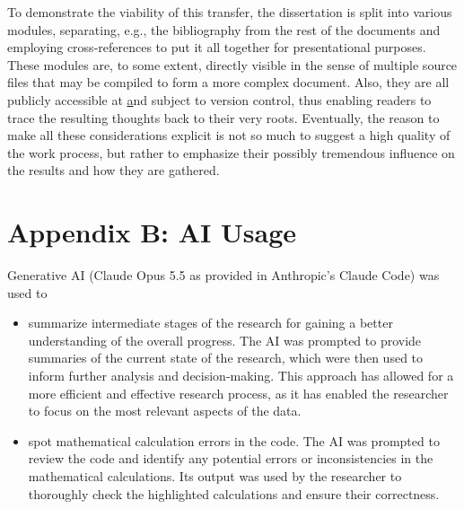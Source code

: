 \documentclass[oneside]{book}
\begin{document}
To demonstrate the viability of this transfer, the dissertation is split into various modules, separating, e.g., the bibliography from the rest of the documents and employing cross-references to put it all together for presentational purposes. These modules are, to some extent, directly visible in the sense of multiple source files that may be compiled to form a more complex document. Also, they are all publicly accessible at \href{https://github.com/konstantinschulz/asrael} and subject to version control, thus enabling readers to trace the resulting thoughts back to their very roots. Eventually, the reason to make all these considerations explicit is not so much to suggest a high quality of the work process, but rather to emphasize their possibly tremendous influence on the results and how they are gathered.

\section{Appendix B: AI Usage}
\label{sec:appendixB}
Generative AI (Claude Opus 5.5 as provided in Anthropic's Claude Code) was used to 
\begin{itemize}
    \item summarize intermediate stages of the research for gaining a better understanding of the overall progress. The AI was prompted to provide summaries of the current state of the research, which were then used to inform further analysis and decision-making. This approach has allowed for a more efficient and effective research process, as it has enabled the researcher to focus on the most relevant aspects of the data.
    \item spot mathematical calculation errors in the code. The AI was prompted to review the code and identify any potential errors or inconsistencies in the mathematical calculations. Its output was used by the researcher to thoroughly check the highlighted calculations and ensure their correctness.
\end{itemize}

\printbibliography[heading=bibintoc]
\end{document}

